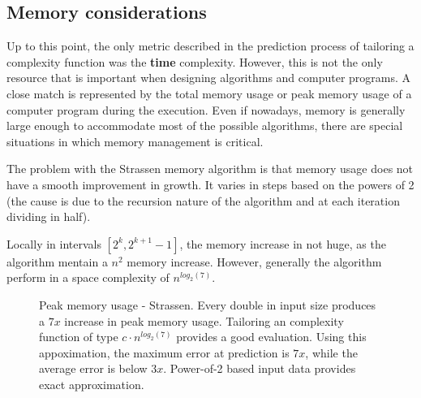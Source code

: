 \subsection{Memory considerations}

Up to this point, the only metric described in the prediction process of tailoring a complexity function was the \textbf{time} complexity. However, this is not the only resource that is important when designing algorithms and computer programs. A close match is represented by the total memory usage or peak memory usage of a computer program during the execution. Even if nowadays, memory is generally large enough to accommodate most of the possible algorithms, there are special situations in which memory management is critical.

The problem with the Strassen memory algorithm is that memory usage does not have a smooth improvement in growth. It varies in steps based on the powers of 2 (the cause is due to the recursion nature of the algorithm and at each iteration dividing in half).

Locally in intervals $[2^k, 2^{k+1} - 1]$, the memory increase in not huge, as the algorithm mentain a $n^2$ memory increase. However, generally the algorithm perform in a space complexity of $n^{log_{2}(7)}$.

\begin{figure}[H]
\caption{Peak memory usage - Strassen. Every double in input size produces a $7x$ increase in peak memory usage. Tailoring an complexity function of type $c \cdot n^{log_2(7)}$ provides a good evaluation. Using this appoximation, the maximum error at prediction is $7x$, while the average error is below $3x$.  Power-of-2 based input data provides exact approximation.}
\end{figure}

